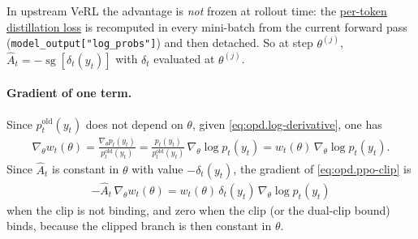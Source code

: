 In upstream VeRL the advantage is \emph{not} frozen at rollout time: the
\href{https://github.com/verl-project/verl/blob/adc7eefa16dad75c5f7b878823d5a76eac90c7b3/verl/trainer/distillation/losses.py#L373-L405}{per-token distillation loss}
is recomputed in every mini-batch from the current forward pass
(\texttt{model\_output["log\_probs"]}) and then detached. So at step $\theta^{(j)}$,
$\hat A_t=-\operatorname{sg}[\delta_t(y_t)]$ with $\delta_t$ evaluated at $\theta^{(j)}$.

\paragraph{Gradient of one term.}
Since $p_t^{\mathrm{old}}(y_t)$ does not depend on $\theta$, given
\eqref{eq:opd.log-derivative}, one has
\begin{align*}
    \nabla_\theta w_t(\theta)
    =
    \frac{\nabla_\theta p_t(y_t)}{p_t^{\mathrm{old}}(y_t)}
    =
    \frac{p_t(y_t)}{p_t^{\mathrm{old}}(y_t)}\,\nabla_\theta\log p_t(y_t)
    =
    w_t(\theta)\,\nabla_\theta\log p_t(y_t).
\end{align*}
Since $\hat A_t$ is constant in $\theta$ with value $-\delta_t(y_t)$, the gradient of
\eqref{eq:opd.ppo-clip} is
\begin{align*}
    -\hat A_t\,\nabla_\theta w_t(\theta)
    =
    w_t(\theta)\,\delta_t(y_t)\,\nabla_\theta\log p_t(y_t)
\end{align*}
when the clip is not binding, and zero when the clip (or the dual-clip bound) binds,
because the clipped branch is then constant in $\theta$.
